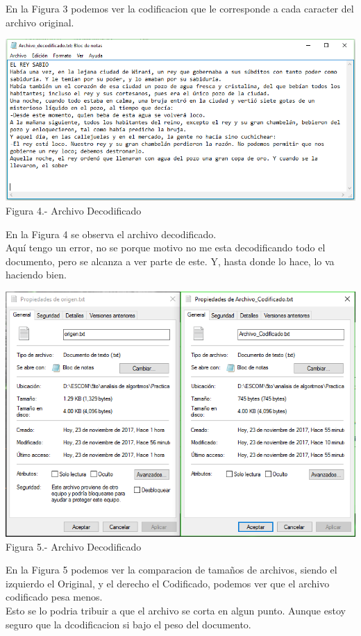 \documentclass[spanish]{article}
\begin{document}
En la Figura 3 podemos ver la codificacion que le corresponde a cada caracter del archivo original.
\newpage
	\begin{center}
		\includegraphics[scale=.5]{./imagenes/prog6.png}\\
		Figura 4.- Archivo Decodificado
	\end{center}
En la Figura 4 se observa el archivo decodificado.\\Aquí tengo un error, no se porque motivo no me esta decodificando todo el documento, pero se alcanza a ver parte de este. Y, hasta donde lo hace, lo va haciendo bien.

\begin{center}
		\includegraphics[scale=.5]{./imagenes/prog7.png}\\
		Figura 5.- Archivo Decodificado
	\end{center}
En la Figura 5 podemos ver la comparacion de tamaños de archivos, siendo el izquierdo el Original, y el derecho el Codificado, podemos ver que el archivo codificado pesa menos.\\Esto se lo podria tribuir a que el archivo se corta en algun punto. Aunque estoy seguro que la dcodificacion si bajo el peso del documento.
\end{document}
